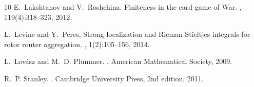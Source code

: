 \documentclass[11pt]{article}
\theoremstyle{definition}
\theoremstyle{remark}
\begin{document}
\begin{thebibliography}{10}
E.~Lakshtanov and V.~Roshchina.
\newblock Finiteness in the card game of War.
, 119(4):318--323, 2012.

L.~Levine and Y.~Peres.
\newblock Strong localization and Rieman-Stieltjes integrals for rotor router aggregation.
, 1(2):105--156, 2014.

L.~Lov\'{a}sz and M.~D. Plummer.
.
\newblock American Mathematical Society, 2009.

R.~P. Stanley.
.
\newblock Cambridge University Press, 2nd edition, 2011.

\end{thebibliography}
\end{document}
